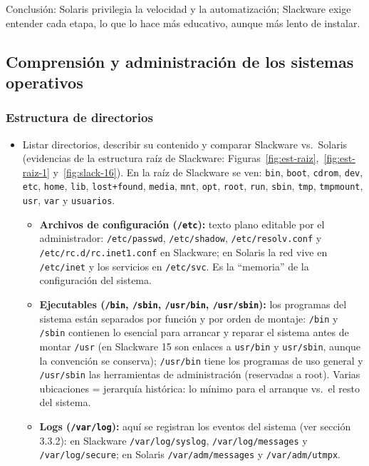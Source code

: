 \documentclass[11pt,a4paper]{report}
\begin{document}
Conclusión: Solaris privilegia la velocidad y la automatización; Slackware exige entender cada etapa, lo que lo hace más educativo, aunque más lento de instalar.

\subsection{Comprensión y administración de los sistemas operativos}

\subsubsection{Estructura de directorios}

\begin{itemize}
  \item Listar directorios, describir su contenido y comparar Slackware vs.\ Solaris (evidencias de la estructura raíz de Slackware: Figuras~\ref{fig:est-raiz},~\ref{fig:est-raiz-1} y~\ref{fig:slack-16}). En la raíz de Slackware se ven: \texttt{bin}, \texttt{boot}, \texttt{cdrom}, \texttt{dev}, \texttt{etc}, \texttt{home}, \texttt{lib}, \texttt{lost+found}, \texttt{media}, \texttt{mnt}, \texttt{opt}, \texttt{root}, \texttt{run}, \texttt{sbin}, \texttt{tmp}, \texttt{tmpmount}, \texttt{usr}, \texttt{var} y \texttt{usuarios}.
    \begin{itemize}
      \item \textbf{Archivos de configuración (\texttt{/etc}):} texto plano editable por el administrador: \texttt{/etc/passwd}, \texttt{/etc/shadow}, \texttt{/etc/resolv.conf} y \texttt{/etc/rc.d/rc.inet1.conf} en Slackware; en Solaris la red vive en \texttt{/etc/inet} y los servicios en \texttt{/etc/svc}. Es la ``memoria'' de la configuración del sistema.
      \item \textbf{Ejecutables (\texttt{/bin}, \texttt{/sbin}, \texttt{/usr/bin}, \texttt{/usr/sbin}):} los programas del sistema están separados por función y por orden de montaje: \texttt{/bin} y \texttt{/sbin} contienen lo esencial para arrancar y reparar el sistema antes de montar \texttt{/usr} (en Slackware 15 son enlaces a \texttt{usr/bin} y \texttt{usr/sbin}, aunque la convención se conserva); \texttt{/usr/bin} tiene los programas de uso general y \texttt{/usr/sbin} las herramientas de administración (reservadas a root). Varias ubicaciones = jerarquía histórica: lo mínimo para el arranque vs.\ el resto del sistema.
      \item \textbf{Logs (\texttt{/var/log}):} aquí se registran los eventos del sistema (ver sección 3.3.2): en Slackware \texttt{/var/log/syslog}, \texttt{/var/log/messages} y \texttt{/var/log/secure}; en Solaris \texttt{/var/adm/messages} y \texttt{/var/adm/utmpx}.

\end{itemize}
\end{itemize}
\end{document}
